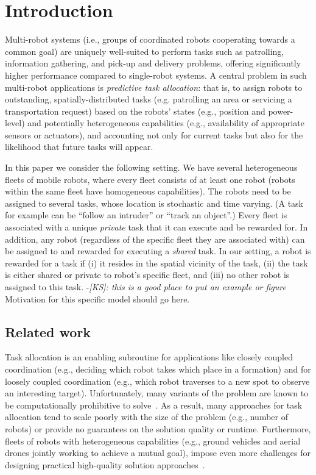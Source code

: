 \documentclass[conference]{IEEEtran}
\newcommand{\ksline}[2]{{\color{blue}#1}{\em \color{blue}[KS]: #2}}
\newcommand{\todo}[1]{{\color{red}{\bf TODO:} #1}}
\newcommand{\ksline}[2]{#1}
\newcommand{\todo}[1]{}
\begin{document}
\section{Introduction}
Multi-robot systems (i.e., groups of coordinated robots cooperating towards a common goal) are uniquely well-suited to perform tasks such as patrolling, information gathering, and pick-up and delivery problems, offering significantly higher performance compared to single-robot systems. A central problem in such multi-robot applications is \emph{predictive task allocation}: that is, to assign robots to outstanding, spatially-distributed tasks (e.g. patrolling an area or servicing a transportation request) based on the robots' states (e.g., position and power-level) and potentially heterogeneous capabilities (e.g., availability of appropriate sensors or actuators), and accounting not only for current tasks but also for the likelihood that future tasks will appear.

In this paper we consider the following setting. We have several heterogeneous fleets of mobile robots, where every fleet consists of at least one robot (robots within the same fleet have homogeneous capabilities). The robots need to be assigned to several tasks, whose location is stochastic and time varying. (A task for example can be ``follow an intruder'' or ``track an object''.) Every fleet is associated with a unique \emph{private} task that it can execute and be rewarded for. In addition, any robot (regardless of the specific fleet they are associated with) can be assigned to and rewarded for executing a \emph{shared} task. In our setting, a robot is rewarded for a task if (i) it resides in the spatial vicinity of the task, (ii) the task is either shared or private to robot's specific fleet, and (iii) no other robot is assigned to this task. \ksline{-}{this is a good place to put an example or figure} 
\todo{Motivation for this specific model should go here.}

\subsection{Related work}
Task allocation is an enabling subroutine for applications like closely coupled coordination (e.g., deciding which robot takes which place in a formation) and for loosely coupled coordination (e.g., which robot traverses to a new spot to observe an interesting target). Unfortunately, many variants of the problem are known to be computationally prohibitive to solve~\cite{GerkeyMataric04,KorashETAL13}. As a result, many approaches for task allocation tend to scale poorly with the size of the problem (e.g., number of robots) or provide no guarantees on the solution quality or runtime. Furthermore, fleets of robots with heterogeneous capabilities (e.g., ground vehicles and aerial drones jointly working to achieve a mutual goal), impose even more challenges for designing practical high-quality solution approaches~\cite{BaiETAL20,AgatzETAL18,FerrandezETAL16,MurrayChu15,Wang2017}. 
\end{document}
